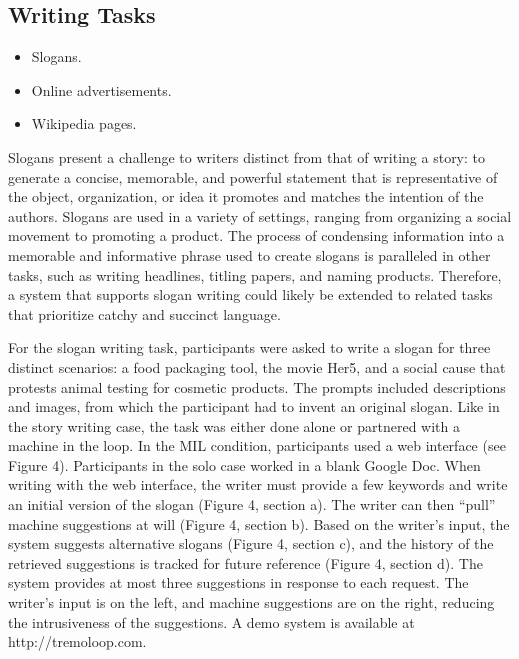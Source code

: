 \subsection{Writing Tasks}

\begin{itemize}
    \item Slogans.
    \item Online advertisements.
    \item Wikipedia pages.
\end{itemize}

Slogans present a challenge to writers distinct from that
of writing a story: to generate a concise, memorable,
and powerful statement that is representative of the object,
organization, or idea it promotes and matches the intention of
the authors. Slogans are used in a variety of settings, ranging
from organizing a social movement to promoting a product.
The process of condensing information into a memorable and
informative phrase used to create slogans is paralleled in other
tasks, such as writing headlines, titling papers, and naming
products. Therefore, a system that supports slogan writing
could likely be extended to related tasks that prioritize catchy
and succinct language.


For the slogan writing task, participants were asked to write
a slogan for three distinct scenarios: a food packaging tool,
the movie Her5, and a social cause that protests animal testing
for cosmetic products. The prompts included descriptions and
images, from which the participant had to invent an original
slogan. Like in the story writing case, the task was either done
alone or partnered with a machine in the loop. In the MIL
condition, participants used a web interface (see Figure 4).
Participants in the solo case worked in a blank Google Doc.
When writing with the web interface, the writer must provide
a few keywords and write an initial version of the slogan
(Figure 4, section a). The writer can then “pull” machine
suggestions at will (Figure 4, section b). Based on the
writer’s input, the system suggests alternative slogans (Figure
4, section c), and the history of the retrieved suggestions is
tracked for future reference (Figure 4, section d). The system
provides at most three suggestions in response to each request.
The writer’s input is on the left, and machine suggestions are
on the right, reducing the intrusiveness of the suggestions. A
demo system is available at http://tremoloop.com.
